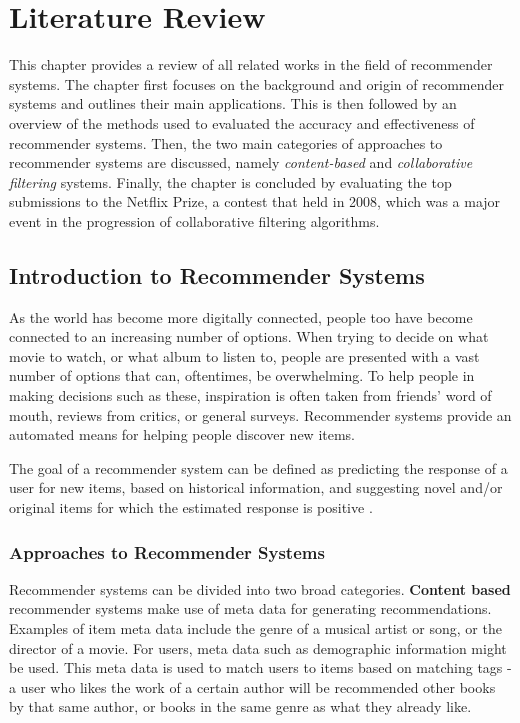 \chapter{Literature Review}
\label{lit_review} %
This chapter provides a review of all related works in the field of recommender systems. The chapter first focuses on the background and origin of recommender systems and outlines their main applications. This is then followed by an overview of the methods used to evaluated the accuracy and effectiveness of recommender systems. Then, the two main categories of approaches to recommender systems are discussed, namely \textit{content-based} and \textit{collaborative filtering} systems. Finally, the chapter is concluded by evaluating the top submissions to the Netflix Prize, a contest that held in 2008, which was a major event in the progression of collaborative filtering algorithms.

\section{Introduction to Recommender Systems}
As the world has become more digitally connected, people too have become connected to an increasing number of options. When trying to decide on what movie to watch, or what album to listen to, people are presented with a vast number of options that can, oftentimes, be overwhelming. To help people in making decisions such as these, inspiration is often taken from friends' word of mouth, reviews from critics, or general surveys. Recommender systems provide an automated means for helping people discover new items. \parencite{rs_1.1_Resnick}

The goal of a recommender system can be defined as predicting the response of a user for new items, based on historical information, and suggesting novel and/or original items for which the estimated response is positive \parencite{handbook_1.4_neighbourhood}.

\subsection*{Approaches to Recommender Systems}
Recommender systems can be divided into two broad categories. \textbf{Content based} recommender systems make use of meta data for generating recommendations. Examples of item meta data include the genre of a musical artist or song, or the director of a movie. For users, meta data such as demographic information might be used. This meta data is used to match users to items based on matching tags - a user who likes the work of a certain author will be recommended other books by that same author, or books in the same genre as what they already like. \parencite{di2012linked}

